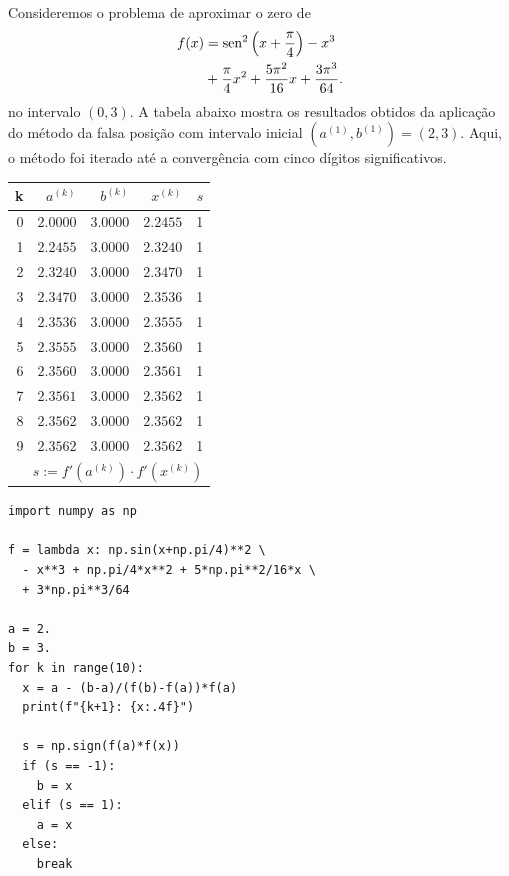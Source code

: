 \begin{ex}
  Consideremos o problema de aproximar o zero de
  \begin{equation}
    \begin{aligned}
      f(x) &= \operatorname{sen}^2\left(x+\frac{\pi}{4}\right) - x^3 \\
           &+ \frac{\pi}{4}x^2 + \frac{5\pi^2}{16}x + \frac{3\pi^3}{64}.
    \end{aligned}
\end{equation}
no intervalo $(0, 3)$. A tabela abaixo mostra os resultados obtidos da aplicação do método da falsa posição com intervalo inicial $(a^{(1)}, b^{(1)}) = (2, 3)$. Aqui, o método foi iterado até a convergência com cinco dígitos significativos.

\begin{center}
  \begin{tabular}{r|rr|r|r}
    k & $a^{(k)}$ & $b^{(k)}$ & $x^{(k)}$ & $s$\\\hline
    0 & $2.0000$ & $3.0000$ & $2.2455$ & 1 \\
    1 & $2.2455$ & $3.0000$ & $2.3240$ &  1 \\
    2 & $2.3240$ & $3.0000$ & $2.3470$ & 1 \\
    3 & $2.3470$ & $3.0000$ & $2.3536$ & 1 \\
    4 & $2.3536$ & $3.0000$ & $2.3555$ & 1 \\
    5 & $2.3555$ & $3.0000$ & $2.3560$ & 1 \\
    6 & $2.3560$ & $3.0000$ & $2.3561$ &  1 \\
    7 & $2.3561$ & $3.0000$ & $2.3562$ & 1 \\
    8 & $2.3562$ & $3.0000$ & $2.3562$ & 1 \\
    9 & $2.3562$ & $3.0000$ & $2.3562$ & 1 \\\hline
    \multicolumn{5}{r}{\small $s := f'(a^{(k)})\cdot f'(x^{(k)})$}
  \end{tabular}
\end{center}

\begin{lstlisting}
import numpy as np

f = lambda x: np.sin(x+np.pi/4)**2 \
  - x**3 + np.pi/4*x**2 + 5*np.pi**2/16*x \
  + 3*np.pi**3/64

a = 2.
b = 3.
for k in range(10):
  x = a - (b-a)/(f(b)-f(a))*f(a)
  print(f"{k+1}: {x:.4f}")

  s = np.sign(f(a)*f(x))
  if (s == -1):
    b = x
  elif (s == 1):
    a = x
  else:
    break
\end{lstlisting}
\end{ex}


